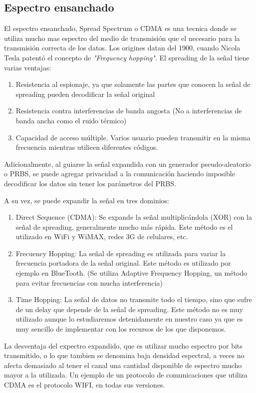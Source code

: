 \documentclass[12pt,twoside,openright]{moddalthesis}
\begin{document}
\subsection{Espectro ensanchado}
\label{espectroensanchado}
El espectro ensanchado, Spread Spectrum o CDMA es una tecnica donde se utiliza mucho mas espectro del medio de transmisión que el necesario para la transmisión correcta de los datos.
Los origines datan del 1900, cuando Nicola Tesla patentó el concepto de \textit{"Frequency hopping"}.
El spreading de la señal tiene varias ventajas:
\begin{enumerate} 
\item Resistencia al espionaje, ya que solamente las partes que conocen la señal de spreading pueden decodificar la señal original
\item Resistencia contra interferencias de banda angosta (No a interferencias de banda ancha como el ruido térmico)
\item Capacidad de acceso múltiple. Varios usuario pueden transmitir en la misma frecuencia mientras utilicen diferentes códigos.
\end{enumerate} 
Adicionalmente, al guiarse la señal expandida con un generador pseudo-aleatorio o PRBS, se puede agregar privacidad a la comunicación haciendo imposible decodificar los datos sin tener los parámetros del PRBS.

A su vez, se puede expandir la señal en tres dominios:
\begin{enumerate} 
\item Direct Sequence (CDMA): Se expande la señal multiplicándola (XOR) con la señal de spreading, generalmente mucho más rápida. Este método es el utilizado en WiFi y WiMAX, redes 3G de celulares, etc.
\item Frecuency Hopping: La señal de spreading es utilizada para variar la frecuencia portadora de la señal original. Este método es utilizado por ejemplo en BlueTooth. (Se utiliza Adaptive Frequency Hopping, un método para evitar frecuencias con mucha interferencia)
\item Time Hopping: La señal de datos no transmite todo el tiempo, sino que sufre de un delay que depende de la señal de spreading. Este método no es muy utilizado aunque lo estudiaremos detenidamente en nuestro caso ya que es muy sencillo de implementar con los recursos de los que disponemos.
\end{enumerate} 


La desventaja del expectro expandido, que es utilizar mucho espectro por bits transmitido, o lo que tambien se denomina baja densidad espectral, a veces no afecta demasiado al tener el canal una cantidad disponible de espectro mucho mayor a la utilizada. Un ejemplo de un protocolo de comunicaciones que utiliza CDMA es el protocolo WIFI, en todas sus versiones.
\end{document}
